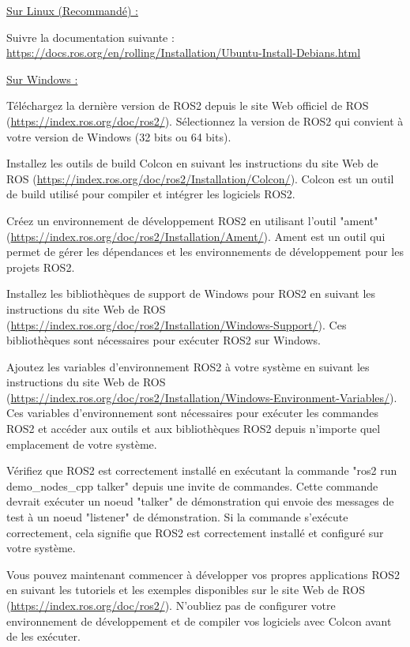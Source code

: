 \underline{Sur Linux (Recommandé) :}
 
Suivre la documentation suivante :
\url{https://docs.ros.org/en/rolling/Installation/Ubuntu-Install-Debians.html}
 \linebreak

 \underline{Sur Windows :}
 
 
Téléchargez la dernière version de ROS2 depuis le site Web officiel de ROS (\url{https://index.ros.org/doc/ros2/}). Sélectionnez la version de ROS2 qui convient à votre version de Windows (32 bits ou 64 bits). 
 
Installez les outils de build Colcon en suivant les instructions du site Web de ROS (\url{https://index.ros.org/doc/ros2/Installation/Colcon/}). Colcon est un outil de build utilisé pour compiler et intégrer les logiciels ROS2. 
 
Créez un environnement de développement ROS2 en utilisant l'outil "ament" (\url{https://index.ros.org/doc/ros2/Installation/Ament/}). Ament est un outil qui permet de gérer les dépendances et les environnements de développement pour les projets ROS2. 
 
Installez les bibliothèques de support de Windows pour ROS2 en suivant les instructions du site Web de ROS (\url{https://index.ros.org/doc/ros2/Installation/Windows-Support/}). Ces bibliothèques sont nécessaires pour exécuter ROS2 sur Windows. 
 
Ajoutez les variables d'environnement ROS2 à votre système en suivant les instructions du site Web de ROS (\url{https://index.ros.org/doc/ros2/Installation/Windows-Environment-Variables/}). Ces variables d'environnement sont nécessaires pour exécuter les commandes ROS2 et accéder aux outils et aux bibliothèques ROS2 depuis n'importe quel emplacement de votre système. 
 
Vérifiez que ROS2 est correctement installé en exécutant la commande "ros2 run demo\_nodes\_cpp talker" depuis une invite de commandes. Cette commande devrait exécuter un noeud "talker" de démonstration qui envoie des messages de test à un noeud "listener" de démonstration. Si la commande s'exécute correctement, cela signifie que ROS2 est correctement installé et configuré sur votre système. 
 
Vous pouvez maintenant commencer à développer vos propres applications ROS2 en suivant les tutoriels et les exemples disponibles sur le site Web de ROS (\url{https://index.ros.org/doc/ros2/}). N'oubliez pas de configurer votre environnement de développement et de compiler vos logiciels avec Colcon avant de les exécuter. 
 

